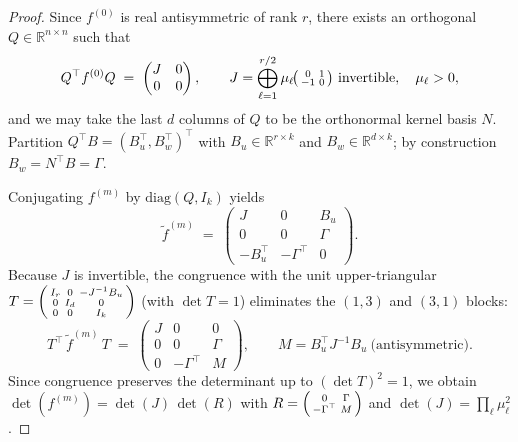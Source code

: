 \documentclass[11pt,a4paper]{article}
\begin{document}
\begin{proof}
	Since $f^{(0)}$ is real antisymmetric of rank $r$, there exists an orthogonal $Q \in \mathbb{R}^{n\times n}$ such that
	\[
	Q^{\top} f^{(0)} Q \;=\; \begin{pmatrix} J & 0 \\ 0 & 0 \end{pmatrix}, \qquad J = \bigoplus_{\ell=1}^{r/2}\mu_\ell\!\begin{psmallmatrix}0 & 1 \\ -1 & 0\end{psmallmatrix}\ \text{invertible},\quad \mu_\ell>0,
	\]
	and we may take the last $d$ columns of $Q$ to be the orthonormal kernel basis $N$. Partition $Q^{\top} B = (B_u^{\top}, B_w^{\top})^{\top}$ with $B_u \in \mathbb{R}^{r\times k}$ and $B_w \in \mathbb{R}^{d\times k}$; by construction $B_w = N^{\top}B = \Gamma$.
	
	Conjugating $f^{(m)}$ by $\mathrm{diag}(Q, I_k)$ yields
	\[
	\widetilde{f}^{(m)} \;=\; \begin{pmatrix} J & 0 & B_u \\ 0 & 0 & \Gamma \\ -B_u^{\top} & -\Gamma^{\top} & 0 \end{pmatrix}.
	\]
	Because $J$ is invertible, the congruence with the unit upper-triangular
	$T = \begin{psmallmatrix} I_r & 0 & -J^{-1}B_u \\ 0 & I_{d} & 0 \\ 0 & 0 & I_k \end{psmallmatrix}$
	(with $\det T = 1$) eliminates the $(1,3)$ and $(3,1)$ blocks:
	\[
	T^{\top}\, \widetilde{f}^{(m)}\, T \;=\; \begin{pmatrix} J & 0 & 0 \\ 0 & 0 & \Gamma \\ 0 & -\Gamma^{\top} & M \end{pmatrix},
	\qquad M = B_u^{\top} J^{-1} B_u\ \text{(antisymmetric)}.
	\]
	Since congruence preserves the determinant up to $(\det T)^2 = 1$, we obtain $\det(f^{(m)}) = \det(J)\,\det(R)$ with $R = \begin{psmallmatrix} 0 & \Gamma \\ -\Gamma^{\top} & M \end{psmallmatrix}$ and $\det(J) = \prod_{\ell}\mu_\ell^{2}$.
	

\end{proof}
\end{document}
